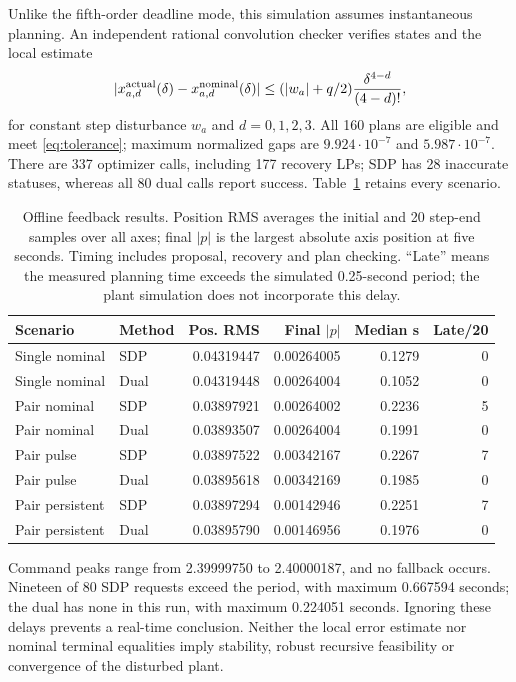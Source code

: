 \documentclass[pdflatex,sn-mathphys-num]{sn-jnl}
\theoremstyle{thmstyleone}
\theoremstyle{thmstyletwo}\newtheorem{remark}[theorem]{Remark}
\begin{document}
Unlike the fifth-order deadline mode, this simulation assumes instantaneous
planning. An independent rational convolution checker verifies states and
the local estimate
\begin{equation}\label{eq:feedback-local}
 |x^{\rm actual}_{a,d}(\delta)-x^{\rm nominal}_{a,d}(\delta)|
 \le (|w_a|+q/2)\frac{\delta^{4-d}}{(4-d)!},
\end{equation}
for constant step disturbance $w_a$ and $d=0,1,2,3$.
All 160 plans are eligible and meet \eqref{eq:tolerance}; maximum normalized
gaps are $9.924\cdot10^{-7}$ and $5.987\cdot10^{-7}$.
There are 337 optimizer calls, including 177 recovery LPs; SDP has 28
inaccurate statuses, whereas all 80 dual calls report success.
Table~\ref{tab:feedback} retains every scenario.
\begin{table}[ht]
\centering\small
\caption{Offline feedback results. Position RMS averages the initial and 20
step-end samples over all axes; final $|p|$ is the largest absolute axis
position at five seconds. Timing includes proposal, recovery and plan checking.
``Late'' means the measured planning time exceeds the simulated 0.25-second
period; the plant simulation does not incorporate this delay.}\label{tab:feedback}
\begin{tabular}{@{}llrrrr@{}}
\toprule
Scenario & Method & Pos. RMS & Final $|p|$ & Median s & Late/20\\
\midrule
Single nominal & SDP & 0.04319447 & 0.00264005 & 0.1279 & 0\\
Single nominal & Dual & 0.04319448 & 0.00264004 & 0.1052 & 0\\
Pair nominal & SDP & 0.03897921 & 0.00264002 & 0.2236 & 5\\
Pair nominal & Dual & 0.03893507 & 0.00264004 & 0.1991 & 0\\
Pair pulse & SDP & 0.03897522 & 0.00342167 & 0.2267 & 7\\
Pair pulse & Dual & 0.03895618 & 0.00342169 & 0.1985 & 0\\
Pair persistent & SDP & 0.03897294 & 0.00142946 & 0.2251 & 7\\
Pair persistent & Dual & 0.03895790 & 0.00146956 & 0.1976 & 0\\
\bottomrule
\end{tabular}
\end{table}

Command peaks range from 2.39999750 to 2.40000187, and no fallback occurs.
Nineteen of 80 SDP requests exceed the period, with maximum 0.667594 seconds;
the dual has none in this run, with maximum 0.224051 seconds.
Ignoring these delays prevents a real-time conclusion. Neither the local
error estimate nor nominal terminal equalities imply stability, robust
recursive feasibility or convergence of the disturbed plant.
\end{document}

